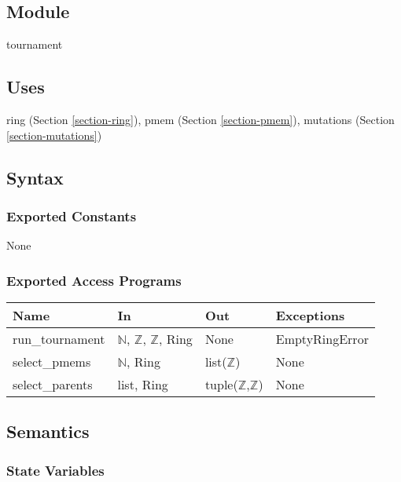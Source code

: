 \documentclass[12pt, titlepage]{article}
\begin{document}
\subsection{Module}

tournament

\subsection{Uses}

ring (Section \ref{section-ring}),
pmem (Section \ref{section-pmem}),
mutations (Section \ref{section-mutations})

\subsection{Syntax}

\subsubsection{Exported Constants}

None

\subsubsection{Exported Access Programs}

\begin{center}
	\begin{tabular}{p{3.5cm} p{4cm} p{4cm} p{2cm}}
		\hline
		\textbf{Name} & \textbf{In} & \textbf{Out} & \textbf{Exceptions} \\
		\hline
		run\_tournament & $\mathbb{N}$, $\mathbb{Z}$, $\mathbb{Z}$, Ring & None 
		& EmptyRingError \\
		select\_pmems & $\mathbb{N}$, Ring & list($\mathbb{Z}$) & None \\
		select\_parents & list, Ring & tuple($\mathbb{Z}$,$\mathbb{Z}$) & None 
		\\
		\hline
	\end{tabular}
\end{center}

\subsection{Semantics}

\subsubsection{State Variables}
\end{document}
